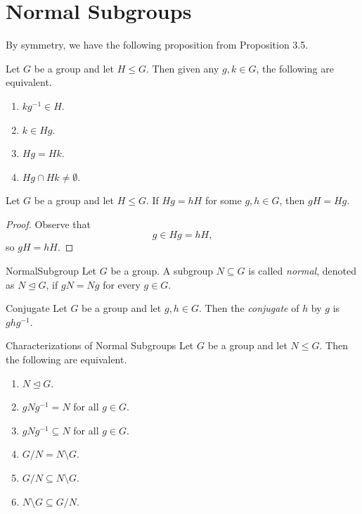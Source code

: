 \documentclass[pmath347]{subfiles}
\begin{document}
    \section{Normal Subgroups}

    \np By symmetry, we have the following proposition from Proposition 3.5.
    
    \begin{prop}{}
        Let $G$ be a group and let $H\leq G$. Then given any $g,k\in G$, the following are equivalent.
        \begin{enumerate}
            \item $kg^{-1} \in H$.
            \item $k\in Hg$.
            \item $Hg=Hk$.
            \item $Hg\cap Hk\neq\emptyset$.
        \end{enumerate}
    \end{prop}

    \begin{prop}{}
        Let $G$ be a group and let $H\leq G$. If $Hg=hH$ for some $g,h\in G$, then $gH=Hg$.
    \end{prop}

    \begin{proof}
        Observe that
        \begin{equation*}
            g\in Hg = hH,
        \end{equation*}
        so $gH=hH$.
    \end{proof}

    \begin{definition}{Normal}{Subgroup}
        Let $G$ be a group. A subgroup $N\subseteq G$ is called \emph{normal}, denoted as $N\trianglelefteq G$, if $gN=Ng$ for every $g\in G$. 
    \end{definition}

    \begin{definition}{Conjugate}{}
        Let $G$ be a group and let $g,h\in G$. Then the \emph{conjugate} of $h$ by $g$ is $ghg^{-1} $.
    \end{definition}

    \begin{prop}{Characterizations of Normal Subgroups}
        Let $G$ be a group and let $N\leq G$. Then the following are equivalent.
        \begin{enumerate}
            \item $N\trianglelefteq G$.
            \item $gNg^{-1} = N$ for all $g\in G$.
            \item $gNg^{-1} \subseteq N$ for all $g\in G$.
            \item $G /N = N\setminus G$.
            \item $G /N \subseteq N\setminus G$.
            \item $N\setminus G\subseteq G /N$.
        \end{enumerate}
    \end{prop}
\end{document}

